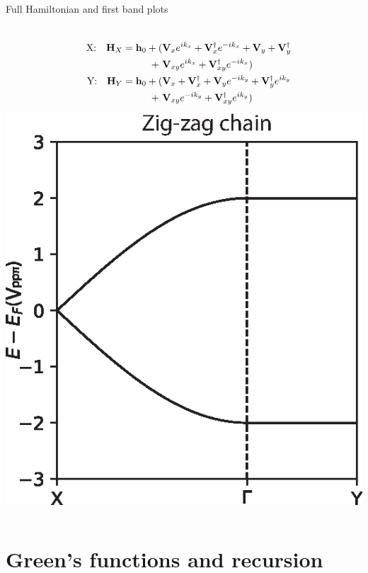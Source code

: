 \documentclass[hyperref={colorlinks=true,urlcolor=blue,linkcolor=.},aspectratio=1610,mathserif]{beamer}
\begin{document}
\begin{frame}{Full Hamiltonian and first band plots}
\begin{overprint}
\begin{columns}[c]
		\end{columns}
		\vspace{-.5cm}
		\begin{columns}[c]
			\begin{align}
				\qq{X:} \vb{H}_{X} = \vb{h}_0 + ( & \vb{V}_{x}e^{ik_x} + \vb{V}_{x}^{\dagger}e^{-ik_x} + \vb{V}_{y} + \vb{V}_{y}^{\dagger}\nonumber \\
				+\                                & \vb{V}_{xy}e^{ik_x} + \vb{V}_{xy}^{\dagger}e^{-ik_x}) \nonumber                                 \\
				\qq{Y:} \vb{H}_{Y} = \vb{h}_0 + ( & \vb{V}_{x} + \vb{V}_{x}^{\dagger} + \vb{V}_{y}e^{-ik_y} + \vb{V}_{y}^{\dagger}e^{ik_y}\nonumber \\
				+\                                & \vb{V}_{xy}e^{-ik_y} + \vb{V}_{xy}^{\dagger}e^{ik_y}) \nonumber
			\end{align}
			\includegraphics[width=\textwidth]{Figures/Beta2.eps}
		\end{columns}
	\end{overprint}
\end{frame}

\section{Green's functions and recursion}
\end{document}
